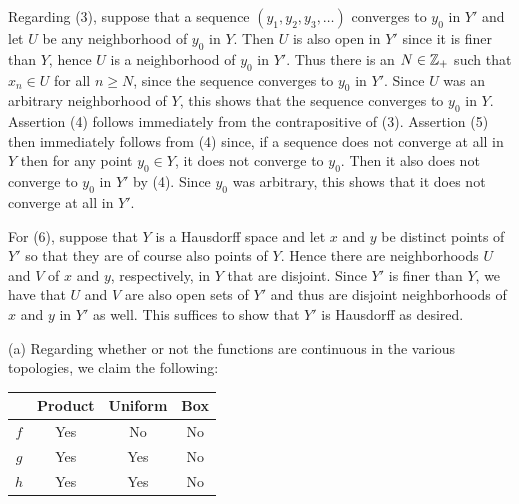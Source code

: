 {{    Regarding (3), suppose that a sequence $(y_1, y_2, y_3, \ldots)$ converges to $y_0$ in $Y'$ and let $U$ be any neighborhood of $y_0$ in $Y$.
    Then $U$ is also open in $Y'$ since it is finer than $Y$, hence $U$ is a neighborhood of $y_0$ in $Y'$.
    Thus there is an $N \in {{\mathbb{Z}}_+}$ such that $x_n \in U$ for all $n \geq N$, since the sequence converges to $y_0$ in $Y'$.
    Since $U$ was an arbitrary neighborhood of $Y$, this shows that the sequence converges to $y_0$ in $Y$.
    Assertion (4) follows immediately from the contrapositive of (3).
    Assertion (5) then immediately follows from (4) since, if a sequence does not converge at all in $Y$ then for any point $y_0 \in Y$, it does not converge to $y_0$.
    Then it also does not converge to $y_0$ in $Y'$ by (4).
    Since $y_0$ was arbitrary, this shows that it does not converge at all in $Y'$.

    For (6), suppose that $Y$ is a Hausdorff space and let $x$ and $y$ be distinct points of $Y'$ so that they are of course also points of $Y$.
    Hence there are neighborhoods $U$ and $V$ of $x$ and $y$, respectively, in $Y$ that are disjoint.
    Since $Y'$ is finer than $Y$, we have that $U$ and $V$ are also open sets of $Y'$ and thus are disjoint neighborhoods of $x$ and $y$ in $Y'$ as well.
    This suffices to show that $Y'$ is Hausdorff as desired.
  }

  \mainprob
  
  (a) Regarding whether or not the functions are continuous in the various topologies, we claim the following:
  \begin{center}
    \begin{tabular}{c|ccc}
      & Product & Uniform & Box \\
      \hline
      $f$ & Yes & No & No \\
      $g$ & Yes & Yes & No \\
      $h$ & Yes & Yes & No
    \end{tabular}
  \end{center}

  }
